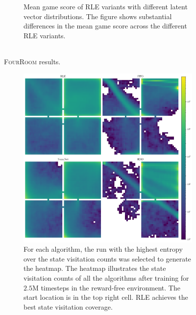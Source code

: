 \begin{figure}[h!]
\begin{subfigure}[b]{0.45\textwidth}
    \caption{Mean game score of \textsc{RLE} variants with different latent vector distributions. The figure shows substantial differences in the mean game score across the different \textsc{RLE} variants.\\\\}
    \label{fig:gridworld-score-distributions}
  \end{subfigure}
  \caption{\textsc{FourRoom} results.}
  \label{fig:gridworld-plots}
\end{figure}

\clearpage
\begin{figure}[h!]
  \centering
  \begin{subfigure}[b]{0.45\textwidth}
    \centering
    \includegraphics[width=\textwidth]{figures/gridworld_heatmaps_no_goal_algorithms.pdf}
    \caption{For each algorithm, the run with the highest entropy over the state visitation counts was selected to generate the heatmap. The heatmap illustrates the state visitation counts of all the algorithms after training for $2.5$M timesteps in the reward-free environment. The start location is in the top right cell. \textsc{RLE} achieves the best state visitation coverage.}
    \label{fig:gridworld-heatmap-nogoal-algorithms}
  \end{subfigure}
  \hfill
  \begin{subfigure}[b]{0.45\textwidth}

\end{subfigure}
\end{figure}
